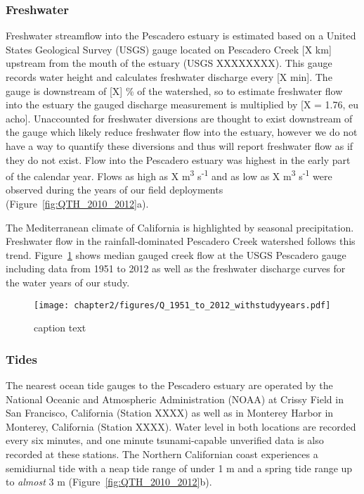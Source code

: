 \subsubsection{Freshwater}
Freshwater streamflow into the Pescadero estuary is
estimated based on a United States Geological Survey (USGS) gauge
located on Pescadero Creek [X km] upstream from the mouth of the estuary
(USGS XXXXXXXX). This gauge records water height and calculates
freshwater discharge every [X min]. The gauge is downstream of [X] \% of
the watershed, so to estimate freshwater flow into the estuary the
gauged discharge measurement is multiplied by [X = 1.76, eu acho].
Unaccounted for freshwater diversions are thought to exist downstream of
the gauge which likely reduce freshwater flow into the estuary, however
we do not have a way to quantify these diversions and thus will report
freshwater flow as if they do not exist. Flow into the Pescadero estuary was highest in the early part of the calendar year. Flows as high as X m\textsuperscript{3} s\textsuperscript{-1} and as low as X m\textsuperscript{3} s\textsuperscript{-1} were observed during the years of our field deployments (Figure~\ref{fig:QTH_2010_2012}a).

The Mediterranean climate of California is highlighted by seasonal
precipitation. Freshwater flow in the rainfall-dominated Pescadero Creek watershed follows this trend. Figure~\ref{fig:Q_1951_2012} shows median gauged creek flow at the USGS Pescadero gauge including data from 1951 to 2012 as well as the freshwater discharge curves for the water years of our study. 


\begin{figure}
\texttt{[image: chapter2/figures/Q\_1951\_to\_2012\_withstudyyears.pdf]} 
\caption{ caption text }\label{fig:Q_1951_2012} \end{figure}


\subsubsection{Tides}
The nearest ocean tide gauges to the Pescadero estuary are
operated by the National Oceanic and Atmospheric Administration (NOAA)
at Crissy Field in San Francisco, California (Station XXXX) as well as
in Monterey Harbor in Monterey, California (Station XXXX). Water
level in both locations are recorded every six minutes, and one minute
tsunami-capable unverified data is also recorded at these stations. The Northern Californian coast experiences a semidiurnal tide with a neap tide range of under 1 m and a spring tide range up to \emph{almost} 3 m (Figure~\ref{fig:QTH_2010_2012}b).



